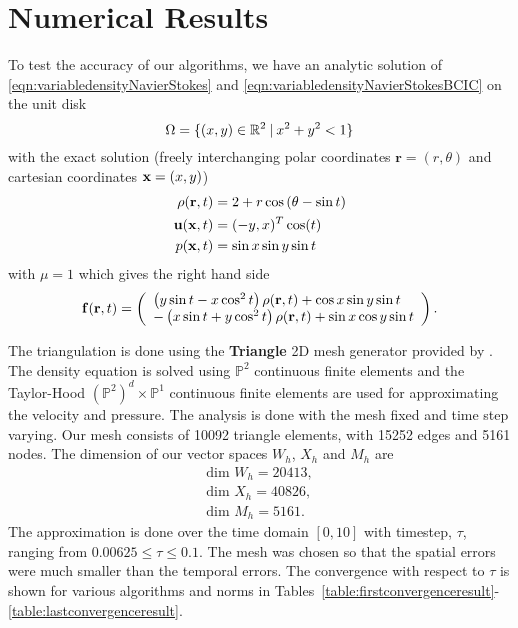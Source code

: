 \documentclass[letterpaper]{erdc}
\begin{document}
%
%
%
\section{Numerical Results}\label{sec:NumericalResults}

To test the accuracy of our algorithms, we have an analytic solution of \ref{eqn:variabledensityNavierStokes} and \ref{eqn:variabledensityNavierStokesBCIC} on the unit disk
\begin{equation}
  \Omega = \{ (x,y) \in \mathbb{R}^{2} \:|\: x^2 + y^2 < 1 \}
\end{equation}
with the exact solution (freely interchanging polar coordinates $\mathbf{r} = (r,\theta)$ and cartesian coordinates $\textbf{x} = (x,y)$)
\begin{align}
  \rho(\mathbf{r},t) & = 2 + r\cos\left(\theta - \sin t  \right)\\
  \textbf{u}(\textbf{x},t) &= (-y, x)^T \cos(t)\\
  p(\textbf{x},t) &= \sin x \sin y \sin t
\end{align}
with $\mu = 1$ which gives the right hand side
\begin{equation}
  \mathbf{f}(\mathbf{r},t) = \left(\begin{array}{l} \left( y\sin t - x\cos^2 t\right)\rho(\mathbf{r},t) + \cos x \sin y \sin t\\ -\left(x \sin t + y\cos^2 t\right)\rho(\mathbf{r},t) + \sin x \cos y \sin t \end{array}\right).
\end{equation}

The triangulation is done using the \textbf{Triangle} 2D mesh generator provided by \cite{shewchuk1996triangle}.  The density equation is solved using $\mathbb{P}^2$ continuous finite elements and the Taylor-Hood $\left(\mathbb{P}^2\right)^d\times \mathbb{P}^1$ continuous finite elements are used for approximating the velocity and pressure.  The analysis is done with the mesh fixed and time step varying.  Our mesh consists of 10092 triangle elements, with 15252 edges and 5161 nodes.  The dimension of our vector spaces $W_h$, $X_h$ and $M_h$ are
\begin{align}
  \mbox{dim }W_h = 20413,\\
  \mbox{dim }X_h = 40826,\\
  \mbox{dim }M_h = 5161.
\end{align}
The approximation is done over the time domain $[0,10]$ with timestep, $\tau$, ranging from $0.00625\leq \tau \leq 0.1$.  The mesh was chosen so that the spatial errors were much smaller than the temporal errors.  The convergence with respect to $\tau$ is shown for various algorithms and norms in Tables~\ref{table:firstconvergenceresult}-\ref{table:lastconvergenceresult}.
\end{document}
